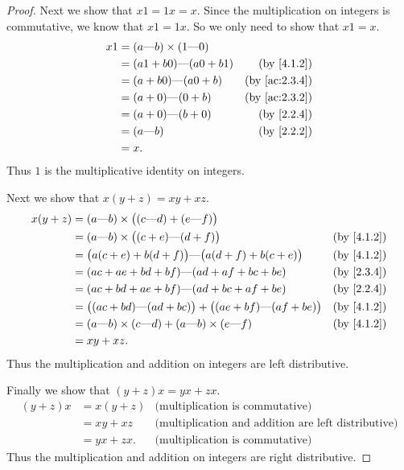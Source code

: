 \begin{proof}
  Next we show that \(x1 = 1x = x\).
  Since the multiplication on integers is commutative, we know that \(x1 = 1x\).
  So we only need to show that \(x1 = x\).
  \begin{align*}
    x1 & = (a \text{---} b) \times (1 \text{---} 0)                               \\
       & = (a1 + b0) \text{---} (a0 + b1)           & \text{(by \cref{4.1.2})}    \\
       & = (a + b0) \text{---} (a0 + b)             & \text{(by \cref{ac:2.3.4})} \\
       & = (a + 0) \text{---} (0 + b)               & \text{(by \cref{ac:2.3.2})} \\
       & = (a + 0) \text{---} (b + 0)               & \text{(by \cref{2.2.4})}    \\
       & = (a \text{---} b)                         & \text{(by \cref{2.2.2})}    \\
       & = x.
  \end{align*}
  Thus \(1\) is the multiplicative identity on integers.

  Next we show that \(x(y + z) = xy + xz\).
  \begin{align*}
    x(y + z) & = (a \text{---} b) \times \big((c \text{---} d) + (e \text{---} f)\big)                                          \\
             & = (a \text{---} b) \times \big((c + e) \text{---} (d + f)\big)                        & \text{(by \cref{4.1.2})} \\
             & = \big(a(c + e) + b(d + f)\big) \text{---} \big(a(d + f) + b(c + e)\big)              & \text{(by \cref{4.1.2})} \\
             & = (ac + ae + bd + bf) \text{---} (ad + af + bc + be)                                  & \text{(by \cref{2.3.4})} \\
             & = (ac + bd + ae + bf) \text{---} (ad + bc + af + be)                                  & \text{(by \cref{2.2.4})} \\
             & = \big((ac + bd) \text{---} (ad + bc)\big) + \big((ae + bf) \text{---} (af + be)\big) & \text{(by \cref{4.1.2})} \\
             & = (a \text{---} b) \times (c \text{---} d) + (a \text{---} b) \times (e \text{---} f) & \text{(by \cref{4.1.2})} \\
             & = xy + xz.
  \end{align*}
  Thus the multiplication and addition on integers are left distributive.

  Finally we show that \((y + z)x = yx + zx\).
  \begin{align*}
    (y + z)x & = x(y + z) & \text{(multiplication is commutative)}                     \\
             & = xy + xz  & \text{(multiplication and addition are left distributive)} \\
             & = yx + zx. & \text{(multiplication is commutative)}
  \end{align*}
  Thus the multiplication and addition on integers are right distributive.
\end{proof}

